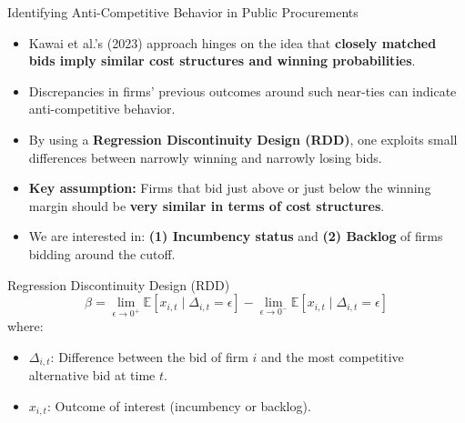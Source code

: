 \documentclass[aspectratio=169]{beamer}
\begin{document}
\begin{frame}{Identifying Anti-Competitive Behavior in Public Procurements}
\begin{itemize}
  \item Kawai et al.'s (2023) approach hinges on the idea that \textbf{closely matched bids imply similar cost structures and winning probabilities}. \vspace{2mm}
  \item Discrepancies in firms' previous outcomes around such near-ties can indicate anti-competitive behavior. \pause \vspace{2mm}
  \item By using a \textbf{Regression Discontinuity Design (RDD)}, one exploits small differences between narrowly winning and narrowly losing bids. \vspace{2mm}
  \item \textbf{Key assumption:} Firms that bid just above or just below the winning margin should be \textbf{very similar in terms of cost structures}. \pause \vspace{2mm}
  \item We are interested in: \textbf{(1) Incumbency status} and \textbf{(2) Backlog} of firms \\ bidding around the cutoff.
\end{itemize}
\end{frame}

\begin{frame}{Regression Discontinuity Design (RDD)}
\[
\beta = \lim_{\epsilon \to 0^+} \mathbb{E}\!\left[x_{i,t} \mid \Delta_{i,t} = \epsilon\right]
   - \lim_{\epsilon \to 0^-} \mathbb{E}\!\left[x_{i,t} \mid \Delta_{i,t} = \epsilon\right]
\]
where:
\begin{itemize}
  \item \( \Delta_{i,t} \): Difference between the bid of firm \( i \) and the most competitive alternative bid at time \( t \).
  \item \( x_{i,t} \): Outcome of interest (incumbency or backlog).
\end{itemize}
\end{frame}
\end{document}
